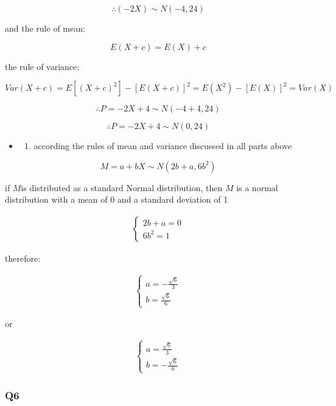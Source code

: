 \documentclass[11pt]{article}
\providecommand{\tightlist}{%
      \setlength{\itemsep}{0pt}\setlength{\parskip}{0pt}}
\begin{document}
\[\therefore (-2X) \sim N(-4, 24)\]

and the rule of mean:

\[E(X+c) = E(X) +c\]

the rule of variance:

\[Var(X+c) = E[(X+c)^2] - [E(X+c)]^2 = E(X^2) - [E(X)]^2 = Var(X)\]

\[\therefore P = -2X + 4 \sim N(-4+4, 24)\]

\[\therefore P = -2X + 4 \sim N(0, 24)\]

    \begin{itemize}
\item
  \begin{enumerate}
  \def\labelenumi{(\alph{enumi})}
  \setcounter{enumi}{3}
  \tightlist
  \item
    according the rules of mean and variance discussed in all parts
    above
  \end{enumerate}
\end{itemize}

\[M = a+bX \sim N(2b+a, 6b^2)\]

if \(M\)is distributed as a standard Normal distribution, then \(M\) is
a normal distribution with a mean of 0 and a standard deviation of 1

\begin{align}
\left\{\begin{matrix} 2b+a=0
\\ 6b^2 = 1
\end{matrix}\right.\end{align}

therefore:

\begin{align}
\left\{\begin{matrix} a = - \frac{\sqrt{6}}{3}
\\ b = \frac{\sqrt{6}}{6}
\end{matrix}\right.\end{align}

or

\begin{align}
\left\{\begin{matrix} a = \frac{\sqrt{6}}{3}
\\ b = -\frac{\sqrt{6}}{6}
\end{matrix}\right.\end{align}

    \subsubsection*{Q6}\label{q6}
\end{document}
